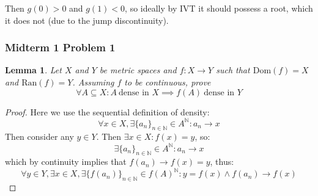 \documentclass[10pt,letterpaper]{article} %
\newtheorem{lem}{Lemma}[section]
\begin{document}
Then $g(0) > 0$ and $g(1) < 0$, so ideally by IVT it should possess a root, which it does not (due to the jump discontinuity). 

\medskip
\subsubsection{Midterm 1 Problem 1}
\begin{lem}
Let $X$ and $Y$ be metric spaces and $f: X \xrightarrow{} Y$ such that $\text{Dom}(f) = X$ and $\text{Ran}(f) = Y$. Assuming $f$ to be continuous, prove
\begin{equation*}
\forall A \subseteq X: A \ \text{dense in } X \implies f(A) \ \text{dense in } Y
\end{equation*}
\end{lem}
\begin{proof}
Here we use the sequential definition of density:
\begin{equation*}
\forall x \in X, \exists \{a_n\}_{n \in \mathbb{N}} \in A^\mathbb{N}: a_n \xrightarrow{} x
\end{equation*}
Then consider any $y \in Y$. Then $\exists x \in X: f(x) = y$, so:
\begin{equation*}
\exists \{a_n\}_{n \in \mathbb{N}} \in A^\mathbb{N}: a_n \xrightarrow{} x
\end{equation*}
which by continuity implies that $f(a_n) \xrightarrow{} f(x) = y$, thus:
\begin{equation*}
\forall y \in Y, \exists x \in X, \exists \{f(a_n)\}_{n \in \mathbb{N}} \in f(A)^\mathbb{N}: y = f(x) \land f(a_n) \xrightarrow{} f(x)
\end{equation*}

\end{proof}
\pagebreak
\end{document}
